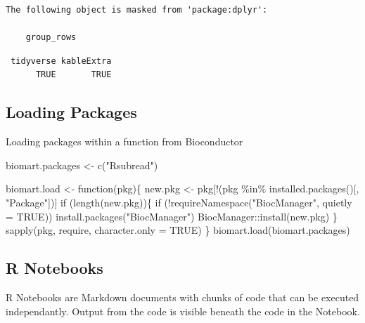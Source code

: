 \documentclass[
  letterpaper,
  DIV=11,
  numbers=noendperiod,
  landscape]{scrartcl}
\newenvironment{Shaded}{\begin{snugshade}}{\end{snugshade}}
\newcommand{\AttributeTok}[1]{\textcolor[rgb]{0.40,0.45,0.13}{#1}}
\newcommand{\ConstantTok}[1]{\textcolor[rgb]{0.56,0.35,0.01}{#1}}
\newcommand{\ControlFlowTok}[1]{\textcolor[rgb]{0.00,0.23,0.31}{#1}}
\newcommand{\FunctionTok}[1]{\textcolor[rgb]{0.28,0.35,0.67}{#1}}
\newcommand{\NormalTok}[1]{\textcolor[rgb]{0.00,0.23,0.31}{#1}}
\newcommand{\OtherTok}[1]{\textcolor[rgb]{0.00,0.23,0.31}{#1}}
\newcommand{\SpecialCharTok}[1]{\textcolor[rgb]{0.37,0.37,0.37}{#1}}
\newcommand{\StringTok}[1]{\textcolor[rgb]{0.13,0.47,0.30}{#1}}
\begin{document}
\begin{verbatim}
The following object is masked from 'package:dplyr':

    group_rows
\end{verbatim}

\begin{verbatim}
 tidyverse kableExtra 
      TRUE       TRUE 
\end{verbatim}

\hypertarget{loading-packages-3}{%
\subsection{Loading Packages}\label{loading-packages-3}}

Loading packages within a function from Bioconductor

\begin{Shaded}
\begin{Highlighting}[numbers=left,,]
\NormalTok{biomart.packages }\OtherTok{\textless{}{-}} \FunctionTok{c}\NormalTok{(}\StringTok{"Rsubread"}\NormalTok{)}

\NormalTok{biomart.load }\OtherTok{\textless{}{-}} \ControlFlowTok{function}\NormalTok{(pkg)\{}
\NormalTok{        new.pkg }\OtherTok{\textless{}{-}}\NormalTok{ pkg[}\SpecialCharTok{!}\NormalTok{(pkg }\SpecialCharTok{\%in\%} \FunctionTok{installed.packages}\NormalTok{()[, }\StringTok{"Package"}\NormalTok{])]}
        \ControlFlowTok{if}\NormalTok{ (}\FunctionTok{length}\NormalTok{(new.pkg))\{}
          \ControlFlowTok{if}\NormalTok{ (}\SpecialCharTok{!}\FunctionTok{requireNamespace}\NormalTok{(}\StringTok{"BiocManager"}\NormalTok{, }\AttributeTok{quietly =} \ConstantTok{TRUE}\NormalTok{))}
            \FunctionTok{install.packages}\NormalTok{(}\StringTok{"BiocManager"}\NormalTok{)}
\NormalTok{            BiocManager}\SpecialCharTok{::}\FunctionTok{install}\NormalTok{(new.pkg)}
\NormalTok{        \}}
        \FunctionTok{sapply}\NormalTok{(pkg, require, }\AttributeTok{character.only =} \ConstantTok{TRUE}\NormalTok{)}
\NormalTok{\}}
\FunctionTok{biomart.load}\NormalTok{(biomart.packages)}
\end{Highlighting}
\end{Shaded}

\hypertarget{r-notebooks}{%
\subsection{R Notebooks}\label{r-notebooks}}

R Notebooks are Markdown documents with chunks of code that can be
executed independantly. Output from the code is visible beneath the code
in the Notebook.
\end{document}

